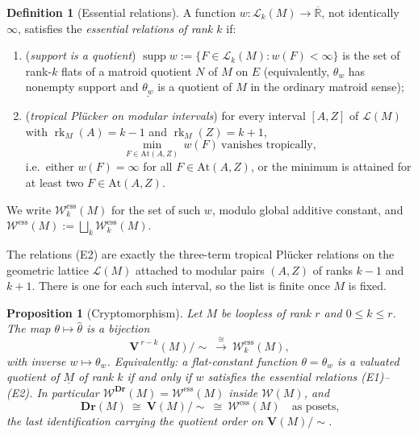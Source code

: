 \documentclass{article}
\newtheorem{proposition}[theorem]{Proposition}
\theoremstyle{definition}
\newtheorem{definition}[theorem]{Definition}
\newcommand{\Rbar}{\overline{\mathbb{R}}}
\newcommand{\rk}{\operatorname{rk}}
\newcommand{\Dr}{\mathbf{Dr}}
\newcommand{\bV}{\mathbf V}
\newcommand{\cLL}{\mathcal{L}}
\newcommand{\cW}{\mathcal{W}}
\begin{document}
\begin{definition}[Essential relations]\label{def:essential}
A function $w\colon\cLL_k(M)\to\Rbar$, not identically $\infty$, satisfies the \emph{essential
relations of rank $k$} if:
\begin{enumerate}
\item[(E1)] (\emph{support is a quotient}) $\operatorname{supp}w:=\{F\in\cLL_k(M):w(F)<\infty\}$ is
the set of rank-$k$ flats of a matroid quotient $N$ of $M$ on $E$ (equivalently, $\theta_w$ has
nonempty support and $\underline{\theta_w}$ is a quotient of $M$ in the ordinary matroid sense);
\item[(E2)] (\emph{tropical Pl\"ucker on modular intervals}) for every interval $[A,Z]$ of
$\cLL(M)$ with $\rk_M(A)=k-1$ and $\rk_M(Z)=k+1$,
\begin{equation}\label{eqn:essential}
  \min_{F\in\mathrm{At}(A,Z)}\,w(F)\ \text{vanishes tropically,}
\end{equation}
i.e.\ either $w(F)=\infty$ for all $F\in\mathrm{At}(A,Z)$, or the minimum is attained for at least
two $F\in\mathrm{At}(A,Z)$.
\end{enumerate}
We write $\cW^{\mathrm{ess}}_k(M)$ for the set of such $w$, modulo global additive constant, and
$\cW^{\mathrm{ess}}(M):=\bigsqcup_k\cW^{\mathrm{ess}}_k(M)$.
\end{definition}

The relations (E2) are exactly the three-term tropical Pl\"ucker relations on the geometric lattice
$\cLL(M)$ attached to modular pairs $(A,Z)$ of ranks $k-1$ and $k+1$. There is one for each such
interval, so the list is finite once $M$ is fixed.

\begin{proposition}[Cryptomorphism]\label{prop:essential-relations}
Let $M$ be loopless of rank $r$ and $0\le k\le r$. The map $\theta\mapsto\widehat\theta$ is a
bijection
\[
  \bV^{\,r-k}(M)/\!\sim\ \xrightarrow{\ \cong\ }\ \cW^{\mathrm{ess}}_k(M),
\]
with inverse $w\mapsto\theta_w$. Equivalently: a flat-constant function $\theta=\theta_w$ is a
valuated quotient of $\underline M$ of rank $k$ \emph{if and only if} $w$ satisfies the essential
relations \textup{(E1)--(E2)}. In particular $\cW^{\Dr}(M)=\cW^{\mathrm{ess}}(M)$ inside $\cW(M)$,
and
\begin{equation}\label{eqn:identification}
  \Dr(M)\ \cong\ \bV(M)/\!\sim\ \cong\ \cW^{\mathrm{ess}}(M)\quad\text{as posets,}
\end{equation}
the last identification carrying the quotient order on $\bV(M)/\!\sim$.
\end{proposition}
\end{document}
